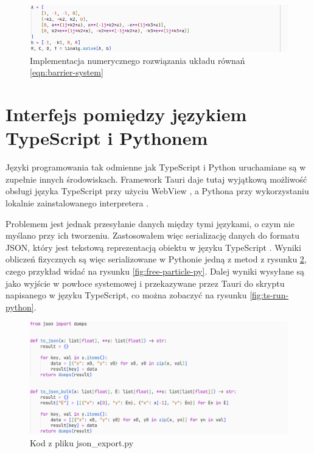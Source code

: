 \documentclass{SGGW-thesis}
\begin{document}
	\begin{figure}[H]
		\includegraphics[width=\textwidth,height=\textheight,keepaspectratio]{linalg solve.png} 
		\caption{Implementacja numerycznego rozwiązania układu równań \ref{eqn:barrier-system}}
		\label{fig:linalg-solve}
	\end{figure}

		
	\section{Interfejs pomiędzy językiem TypeScript i Pythonem}
		Języki programowania tak odmienne jak TypeScript i Python uruchamiane są w zupełnie innych środowiskach. Framework Tauri daje tutaj wyjątkową możliwość obsługi języka TypeScript przy użyciu WebView \cite{tauri-arch}, a Pythona przy wykorzystaniu lokalnie zainstalowanego interpretera \cite{tauri-shell}.
		
		Problemem jest jednak przesyłanie danych między tymi językami, o czym nie myślano przy ich tworzeniu. Zastosowałem więc serializację danych do formatu JSON, który jest tekstową reprezentacją obiektu w języku TypeScript \cite{JS}. Wyniki obliczeń fizycznych są więc serializowane w Pythonie jedną z metod z rysunku \ref{fig:to-json}, czego przykład widać na rysunku \ref{fig:free-particle-py}. Dalej wyniki wysyłane są jako wyjście w powłoce systemowej i przekazywane przez Tauri do skryptu napisanego w języku TypeScript, co można zobaczyć na rysunku \ref{fig:ts-run-python}.
		
	\begin{figure}[H]
	\includegraphics[width=\textwidth,height=\textheight,keepaspectratio]{to_json.png} 
	\caption{Kod z pliku json\_export.py}
	\label{fig:to-json}
	\end{figure}	
	
\end{document}
